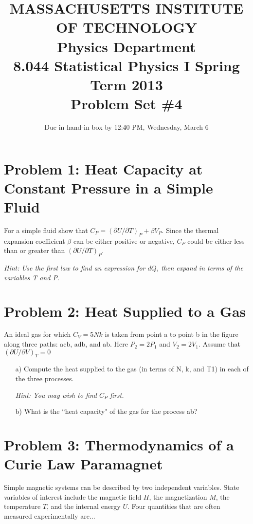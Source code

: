 \documentclass[12pt]{article}
\title{\vspace{-3.0cm}MASSACHUSETTS INSTITUTE OF TECHNOLOGY\\
Physics Department\\
8.044 Statistical Physics I Spring Term 2013\\
Problem Set \#4}
\date{Due in hand-in box by 12:40 PM, Wednesday, March 6}
\begin{document}
\maketitle

\section*{Problem 1: Heat Capacity at Constant Pressure in a Simple Fluid}
For a simple fluid show that $C_P=(\partial U/\partial T)_P+\beta V_P$. Since the thermal expansion coefficient $\beta$ can be either positive or negative, $C_P$ could be either less than or greater than $(\partial U/\partial T)_P$.

\textit{Hint: Use the first law to find an expression for $dQ$, then expand in terms of the variables T and P.}

\bigskip

\section*{Problem 2: Heat Supplied to a Gas}
An ideal gas for which $C_V=5Nk$ is taken from point a to point b in the figure along three paths: acb, adb, and ab. Here $P_2=2P_1$ and $V_2=2V_1$. Assume that $(\partial U/\partial V)_T=0$

\begin{enumerate}
\item[a)] Compute the heat supplied to the gas (in terms of N, k, and T1) in each of the three processes. 

\textit{Hint: You may wish to find $C_P$ first.}

\item[b)] What is the ``heat capacity" of the gas for the process ab?
\end{enumerate}

\bigskip

\section*{Problem 3: Thermodynamics of a Curie Law Paramagnet}
Simple magnetic systems can be described by two independent variables. State variables of interest include the magnetic field $H$, the magnetization $M$, the temperature $T$, and the internal energy $U$. Four quantities that are often measured experimentally are...
\end{document}
